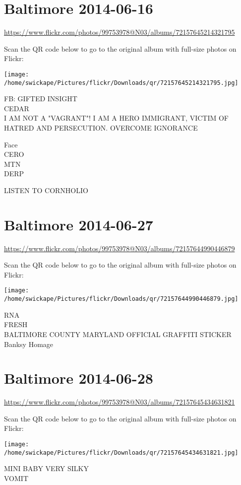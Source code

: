 \documentclass[10pt,letterpaper]{article}
\begin{document}
\section*{Baltimore 2014-06-16}

\url{https://www.flickr.com/photos/99753978@N03/albums/72157645214321795}

Scan the QR code below to go to the original album with full-size photos on Flickr:

\texttt{[image: /home/swickape/Pictures/flickr/Downloads/qr/72157645214321795.jpg]}


FB: GIFTED INSIGHT\\
CEDAR\\
I AM NOT A "VAGRANT"!  I AM A HERO IMMIGRANT, VICTIM OF HATRED AND PERSECUTION.  OVERCOME IGNORANCE

Face\\
CERO\\
MTN\\
DERP

LISTEN TO CORNHOLIO


\section*{Baltimore 2014-06-27}

\url{https://www.flickr.com/photos/99753978@N03/albums/72157644990446879}

Scan the QR code below to go to the original album with full-size photos on Flickr:

\texttt{[image: /home/swickape/Pictures/flickr/Downloads/qr/72157644990446879.jpg]}


RNA\\
FRESH\\
BALTIMORE COUNTY MARYLAND OFFICIAL GRAFFITI STICKER\\
Banksy Homage


\section*{Baltimore 2014-06-28}

\url{https://www.flickr.com/photos/99753978@N03/albums/72157645434631821}

Scan the QR code below to go to the original album with full-size photos on Flickr:

\texttt{[image: /home/swickape/Pictures/flickr/Downloads/qr/72157645434631821.jpg]}


MINI BABY VERY SILKY\\
VOMIT
\end{document}
